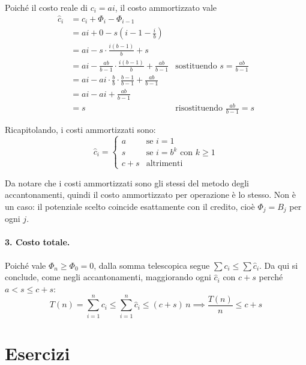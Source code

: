 \begin{description}
    Poiché il costo reale di $c_i = ai$, il costo ammortizzato vale
    \begin{align*}
        \hat{c}_i &= c_i + \Phi_i - \Phi_{i-1} \\
        &= ai + 0 - s\left(i-1 - \frac{i}{b}\right) \\
        &= ai - s \cdot \frac{i(b-1)}{b} + s \\
        &= ai - \frac{ab}{b-1} \cdot \frac{i(b-1)}{b} + \frac{ab}{b-1} & \text{sostituendo } s = \frac{ab}{b-1} \\
        &= ai - ai \cdot \frac{b}{b} \cdot \frac{b-1}{b-1} + \frac{ab}{b-1} \\
        &= ai - ai + \frac{ab}{b-1} \\
        &= s & \text{risostituendo } \frac{ab}{b-1} = s
    \end{align*}
\end{description}

Ricapitolando, i costi ammortizzati sono:
\[
    \hat{c}_i = 
    \begin{cases}
        a & \text{se } i=1 \\
        s & \text{se } i = b^k \text{ con } k \ge 1 \\
        c+s & \text{altrimenti}
    \end{cases}
\]

\begin{osservazione}
    Da notare che i costi ammortizzati sono gli stessi del metodo degli accantonamenti, quindi il costo ammortizzato per operazione è lo stesso. Non è un caso: il potenziale scelto coincide esattamente con il credito, cioè $\Phi_j = B_j$ per ogni $j$.
\end{osservazione}

\paragraph{3. Costo totale.}
Poiché vale $\Phi_n \ge \Phi_0 = 0$, dalla somma telescopica segue $\sum c_i \le \sum \hat{c}_i$. Da qui si conclude, come negli accantonamenti, maggiorando ogni $\hat{c}_i$ con $c+s$ perché $a < s \le c+s$:
\begin{equation}
    T(n) = \sum_{i=1}^n c_i \le \sum_{i=1}^n \hat{c}_i \le (c+s)\,n
    \implies \frac{T(n)}{n} \le c + s
\end{equation}

\section{Esercizi}\label{sec:appendice_esercizi_analisi_ammortizzata_esercizi}

